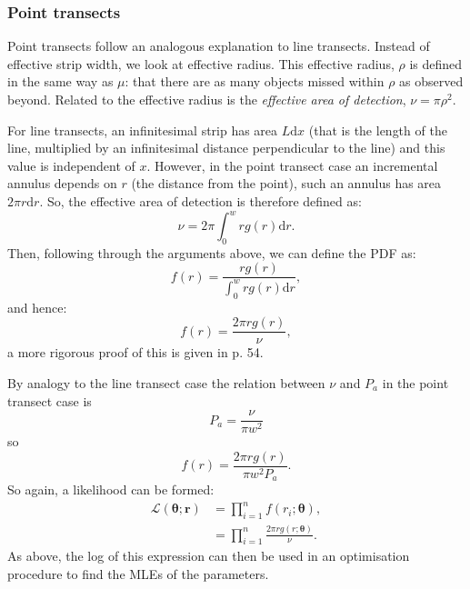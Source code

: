 \subsubsection{Point transects} 

Point transects follow an analogous explanation to line transects. Instead of effective strip width, we look at effective radius. This effective radius, $\rho$ is defined in the same way as $\mu$: that there are as many objects missed within $\rho$ as observed beyond. Related to the effective radius is the \textit{effective area of detection}, $\nu=\pi \rho^2$.

For line transects, an infinitesimal strip has area $L\text{d}x$ (that is the length of the line, multiplied by an infinitesimal distance perpendicular to the line) and this value is independent of $x$. However, in the point transect case an incremental annulus depends on $r$ (the distance from the point), such an annulus has area $2\pi r \text{d}r$. So, the effective area of detection is therefore defined as:
\begin{equation}
\nu = 2 \pi \int_0^w r g(r) \text{d}r.
\end{equation}
Then, following through the arguments above, we can define the PDF as:
\begin{equation}
f(r) = \frac{r g(r)}{\int_0^w r g(r) \text{d}r},
\end{equation}
and hence: 
\begin{equation}
f(r) = \frac{2 \pi r g(r)}{\nu},
\end{equation}
a more rigorous proof of this is given in \cite{IDS} p. 54.

By analogy to the line transect case the relation between $\nu$ and $P_a$ in the point transect case is
\begin{equation}
P_a=\frac{\nu}{\pi w^2}
\end{equation}
so
\begin{equation}
f(r) = \frac{2 \pi r g(r)}{\pi w^2 P_a}.
\end{equation}
So again, a likelihood can be formed:
\begin{align}
\mathcal{L}(\bm{\theta}; \bm{r}) &= \prod_{i=1}^n f(r_i;\bm{\theta}),\\
&= \prod_{i=1}^n \frac{2 \pi r g(r;\bm{\theta})}{\nu}.
\end{align}
As above, the log of this expression can then be used in an optimisation procedure to find the MLEs of the parameters.


